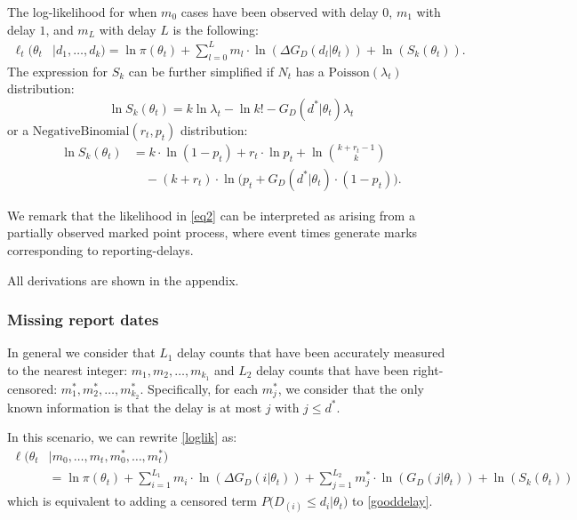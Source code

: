 \documentclass[12pt]{article}
\begin{document}
The log-likelihood for when $m_0$ cases have been observed with delay $0$, $m_1$ with delay $1$, and $m_L$ with delay $L$ is the following:
\begin{equation}\label{loglik}
\begin{aligned}
    \ell_t(\theta_t & | d_1, \dots, d_{k}) = 
    \ln{\pi(\theta_t)} + \sum\limits_{l=0}^L m_l\cdot \ln{\left(\Delta G_D(d_l|\theta_t)\right)} + \ln{\left(S_k(\theta_t)\right)}.
\end{aligned}
\end{equation}
The expression for $S_k$ can be further simplified if $N_t$ has a $\text{Poisson}(\lambda_t)$ distribution:
\begin{equation}
    \ln S_k(\theta_t) = 
k \ln \lambda_t - \ln k! - G_D(d^* | \theta_t) \lambda_t
\end{equation}
or a $\text{NegativeBinomial}(r_t,p_t)$ distribution:
\begin{equation}
\begin{aligned}
\ln S_k(\theta_t) & = 
k \cdot \ln (1 - p_t) + r_t \cdot \ln p_t + \ln \binom{k + r_t - 1}{k} 
\\ & \quad - (k + r_t)\cdot \ln \big( p_t + G_D(d^*|\theta_t) \cdot (1 - p_t) \big).
\end{aligned}
\end{equation}

We remark that the likelihood in \eqref{eq2} can be interpreted as arising from a partially observed marked point process, where event times generate marks corresponding to reporting-delays. 

All derivations are shown in the appendix. 


\subsubsection{Missing report dates}

In general we consider that $L_1$ delay counts that have been accurately measured to the nearest integer: $m_1, m_2, \dots, m_{k_1}$ and $L_2$ delay counts that have been right-censored: $m_1^*, m_2^*, \dots, m_{k_2}^*$. Specifically, for each $m_j^*$, we consider that the only known information is that the delay is at most $j$ with $j \leq d^*$.   

In this scenario, we can rewrite \eqref{loglik} as:
\begin{equation}\label{logliksimplified}
    \begin{aligned}
        \ell(\theta_t & | m_0, \dots, m_{t}, m_0^{*}, \dots, m_{t}^{*}) 
        \\ & = \ln{\pi(\theta_t)} + \sum\limits_{i=1}^{L_1} m_i \cdot \ln{\left(\Delta G_D(i|\theta_t)\right)} +\sum\limits_{j=1}^{L_2} m_j^{*} \cdot \ln{\left(G_D(j|\theta_t)\right)} + \ln{\left(S_k(\theta_t)\right)}
    \end{aligned}
\end{equation}
which is equivalent to adding a censored term $P\big(D_{(i)} \leq d_i|\theta_t\big)$ to \eqref{gooddelay}. 
\end{document}

